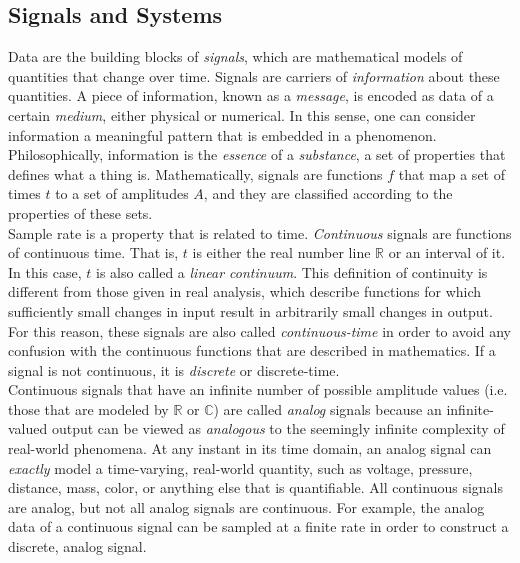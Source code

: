 \subsection{Signals and Systems}

Data are the building blocks of \textit{signals}, which are mathematical models of quantities that change over time. Signals are carriers of \textit{information} about these quantities. A piece of information, known as a \textit{message}, is encoded as data of a certain \textit{medium}, either physical or numerical. In this sense, one can consider information a meaningful pattern that is embedded in a phenomenon. Philosophically, information is the \textit{essence} of a \textit{substance}, a set of properties that defines what a thing is. Mathematically, signals are functions $f$ that map a set of times $t$ to a set of amplitudes $A$, and they are classified according to the properties of these sets. \\

Sample rate is a property that is related to time. \textit{Continuous} signals are functions of continuous time. That is, $t$ is either the real number line $\mathbb{R}$ or an interval of it. In this case, $t$ is also called a \textit{linear continuum}. This definition of continuity is different from those given in real analysis, which describe functions for which sufficiently small changes in input result in arbitrarily small changes in output. For this reason, these signals are also called \textit{continuous-time} in order to avoid any confusion with the continuous functions that are described in mathematics. If a signal is not continuous, it is \textit{discrete} or discrete-time. \\

Continuous signals that have an infinite number of possible amplitude values (i.e. those that are modeled by $\mathbb{R}$ or $\mathbb{C}$) are called \textit{analog} signals because an infinite-valued output can be viewed as \textit{analogous} to the seemingly infinite complexity of real-world phenomena. At any instant in its time domain, an analog signal can \textit{exactly} model a time-varying, real-world quantity, such as voltage, pressure, distance, mass, color, or anything else that is quantifiable. All continuous signals are analog, but not all analog signals are continuous. For example, the analog data of a continuous signal can be sampled at a finite rate in order to construct a discrete, analog signal. \\


